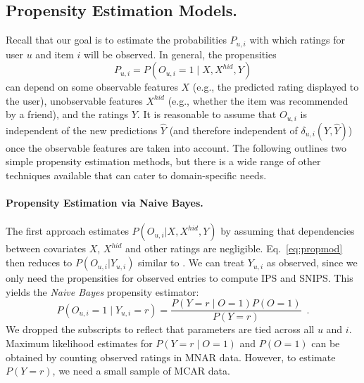 \documentclass{article}
\newcommand{\user}{u}                       %
\newcommand{\movie}{i}                      %
\newcommand{\xpropobs}{X}                   %
\newcommand{\xprophid}{X^{hid}}             %
\newcommand{\ytrue}{Y}                      %
\newcommand{\ytrueelem}[1]{\ytrue_{#1}}
\newcommand{\ytrueum}{\ytrueelem{\user,\movie}}
\newcommand{\ypred}{\hat{Y}}                %
\newcommand{\loss}[3]{\delta_{#1}(#2,#3)}   %
\newcommand{\lossum}{\loss{\user,\movie}{\ytrue}{\ypred}}
\newcommand{\obs}{O}                        %
\newcommand{\obselem}[1]{\obs_{#1}}
\newcommand{\obsum}{\obselem{\user,\movie}}
\newcommand{\probobs}{P}                    %
\newcommand{\probobselem}[1]{\probobs_{#1}}
\newcommand{\probobsum}{\probobselem{\user,\movie}}
\begin{document}
\subsection{Propensity Estimation Models.}
Recall that our goal is to estimate the probabilities $\probobsum$ with which ratings for user $\user$ and item $\movie$ will be observed. In general, the propensities
\vspace{-2mm}
\begin{equation}
    \probobsum = P(\obsum = 1\mid\xpropobs,\xprophid,\ytrue) \label{eq:propmod}
\end{equation}
can depend on some observable features $\xpropobs$ (e.g., the predicted rating displayed to the user), unobservable features $\xprophid$ (e.g., whether the item was recommended by a friend), and the ratings $\ytrue$. It is reasonable to assume that $\obsum$ is independent of the new predictions $\ypred$ (and therefore independent of $\lossum$) once the observable 
features are taken into account. The following outlines two simple propensity estimation methods, but there is a wide range of other techniques available \citep[e.g.,][]{Mccaffrey04propensityscore} that can cater to domain-specific needs.
\vspace{-3mm}
\paragraph{Propensity Estimation via Naive Bayes.}
\label{sec:prop_nb}
The first approach estimates $P(\obsum|\xpropobs,\xprophid,\ytrue)$ by assuming that dependencies between covariates $\xpropobs$, $\xprophid$ and other ratings are negligible. Eq.~\eqref{eq:propmod} then reduces to $P(\obsum|\ytrueum)$ similar to \citet{Marlin/Zemel/09}. We can treat $\ytrueum$ as observed, since we only need the propensities for observed entries to compute IPS and SNIPS. This yields the {\em Naive Bayes} propensity estimator:
\vspace{-2mm}
\begin{equation}
    P(\obsum = 1\mid\ytrueum = r) = \frac{P(\ytrue = r \mid\obs = 1) P(\obs = 1)}{P(\ytrue = r)}\enspace . \label{eq:propmodnb}
\end{equation}
We dropped the subscripts to reflect that parameters are tied across all $\user$ and $\movie$. 
Maximum likelihood estimates for $P(\ytrue = r \mid \obs=1)$ and $P(\obs = 1)$ can be obtained by counting
observed ratings in MNAR data.
However, to estimate $P(\ytrue = r)$, %
we need a small sample of MCAR data.
\vspace{-3mm}
\end{document}
